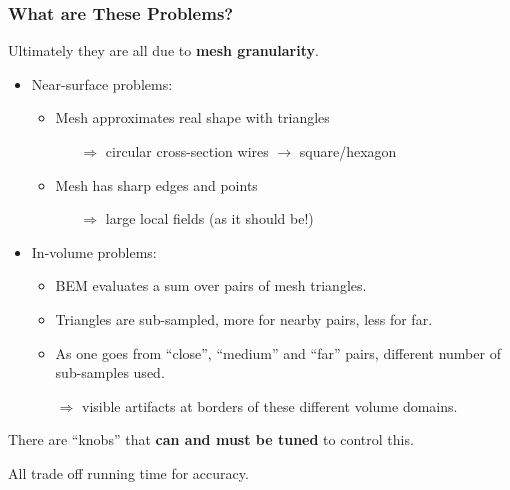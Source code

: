 \documentclass[xcolor=dvipsnames]{beamer}
\begin{document}
\begin{frame}
  \frametitle{What are These Problems?}
  Ultimately they are all due to \textbf{mesh granularity}.  
  \vspace{5mm}
  \begin{itemize}
  \item Near-surface problems:
    \begin{itemize}\footnotesize
    \item Mesh approximates real shape with triangles 
      \begin{itemize}\scriptsize
      \item[$\Rightarrow$] circular cross-section wires $\to$ square/hexagon
      \end{itemize}
    \item Mesh has sharp edges and points 
      \begin{itemize}\scriptsize
      \item[$\Rightarrow$] large local fields (as it should be!)
      \end{itemize}
    \end{itemize}
  \item In-volume problems:
    \begin{itemize}\footnotesize
    \item BEM evaluates a sum over pairs of mesh triangles.
    \item Triangles are sub-sampled, more for nearby pairs, less for far.
    \item As one goes from ``close'', ``medium'' and ``far'' pairs, different number of sub-samples used.
    \item[$\Rightarrow$] visible artifacts at borders of these different volume domains.
    \end{itemize}
  \end{itemize}
  \vspace{5mm}
  There are ``knobs'' that \textbf{can and must be tuned} to control this.
  
  All trade off running time for accuracy.
\end{frame}
\end{document}
